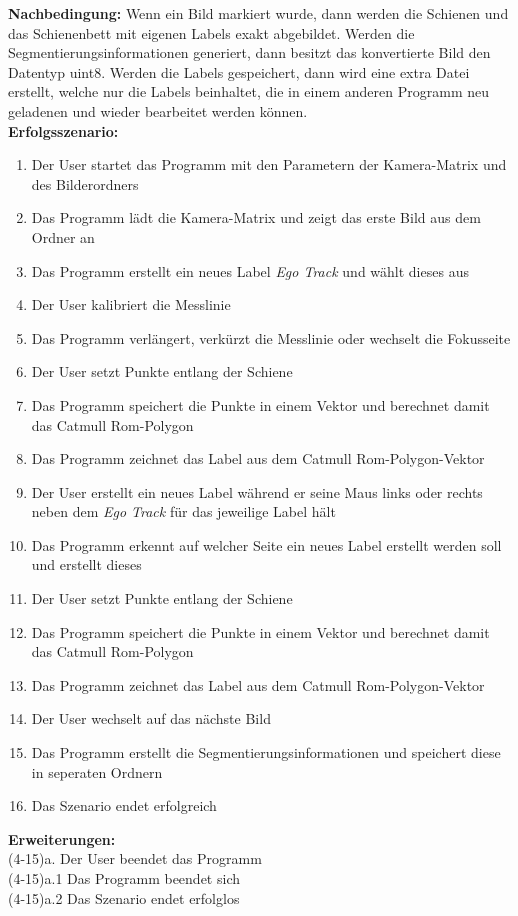 \noindent
\textbf{Nachbedingung:} Wenn ein Bild markiert wurde, dann werden die Schienen und das Schienenbett mit eigenen Labels exakt abgebildet. Werden die Segmentierungsinformationen generiert, dann besitzt das konvertierte Bild den Datentyp uint8. Werden die Labels gespeichert, dann wird eine extra Datei erstellt, welche nur die Labels beinhaltet, die in einem anderen Programm neu geladenen und wieder bearbeitet werden können.
\\ 

\noindent
\textbf{Erfolgsszenario:}

\begin{enumerate}
	\item Der User startet das Programm mit den Parametern der Kamera-Matrix und des Bilderordners
	\item Das Programm lädt die Kamera-Matrix und zeigt das erste Bild aus dem Ordner an
	\item Das Programm erstellt ein neues Label \textit{Ego Track} und wählt dieses aus
	\item Der User kalibriert die Messlinie
	\item Das Programm verlängert, verkürzt die Messlinie oder wechselt die Fokusseite
	\item Der User setzt Punkte entlang der Schiene
	\item Das Programm speichert die Punkte in einem Vektor und berechnet damit das Catmull Rom-Polygon
	\item Das Programm zeichnet das Label aus dem Catmull Rom-Polygon-Vektor
	\item Der User erstellt ein neues Label während er seine Maus links oder rechts neben dem \textit{Ego Track} für das jeweilige Label hält
	\item Das Programm erkennt auf welcher Seite ein neues Label erstellt werden soll und erstellt dieses
	\item Der User setzt Punkte entlang der Schiene
	\item Das Programm speichert die Punkte in einem Vektor und berechnet damit das Catmull Rom-Polygon
	\item Das Programm zeichnet das Label aus dem Catmull Rom-Polygon-Vektor
	\item Der User wechselt auf das nächste Bild
	\item Das Programm erstellt die Segmentierungsinformationen und speichert diese in seperaten Ordnern
	\item Das Szenario endet erfolgreich
\end{enumerate}
\textbf{Erweiterungen:}
\\ 
\noindent
(4-15)a. Der User beendet das Programm
\\ 
\noindent
(4-15)a.1 Das Programm beendet sich
\\ 
\noindent
(4-15)a.2 Das Szenario endet erfolglos
\\

